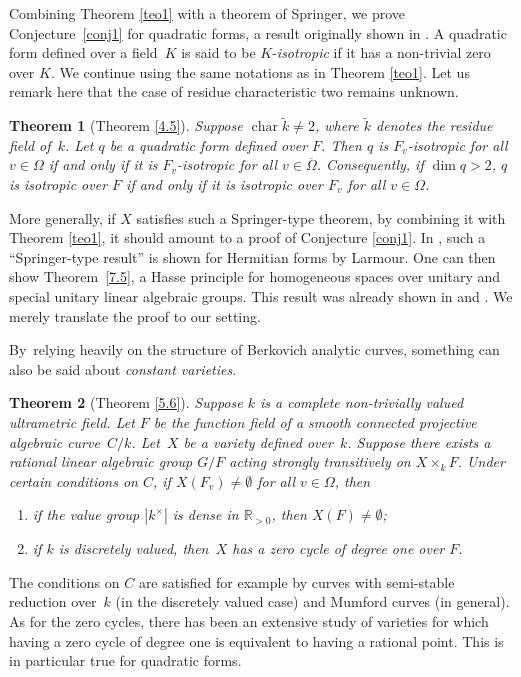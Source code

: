 \documentclass[JEP,XML,SOM,Unicode,NoFloatCountersInSection,published]{cedram}
\DeclareMathOperator{\Char}{char}
\newtheorem{thm}{Theorem}[section]
\theoremstyle{definition}
\begin{document}
Combining Theorem \ref{teo1} with a theorem of Springer, we prove Conjecture~\ref{conj1} for quadratic forms, a result originally shown in \cite{ctps}. A quadratic form defined over a field~$K$ is said to be $K$-\emph{isotropic} if it has a non-trivial zero over $K$. We continue using the same notations as in Theorem \ref{teo1}. Let us remark here that the case of residue characteristic two remains unknown.
\begin{thm}[Theorem \ref{4.5}]
Suppose $\Char \widetilde{k} \neq 2$, where $\widetilde{k}$ denotes the residue field of~$k$. Let $q$ be a quadratic form defined over $F$. Then $q$ is $F_v$-isotropic for all $v \in \Omega$ if and only if it is $F_v$-isotropic for all $v \in \overline{\Omega}$. Consequently, if $\dim{q}>2$, $q$ is isotropic over $F$ if and only if it is isotropic over $F_v$ for all $v \in \Omega$.
\end{thm}

More generally, if $X$ satisfies such a Springer-type theorem, by combining it with Theorem \ref{teo1}, it should amount to a proof of Conjecture \ref{conj1}. In \cite{larmour}, such a ``Springer-type result'' is shown for Hermitian forms by Larmour. One can then show Theorem~\ref{7.5}, a Hasse principle for homogeneous spaces over unitary and special unitary linear algebraic groups. This result was already shown in \cite{wu} and \cite{parsur}. We merely translate the proof to our setting.

By~relying heavily on the structure of Berkovich analytic curves, something can also be said about \emph{constant varieties}.

\begin{thm}[Theorem \ref{5.6}] Suppose $k$ is a complete non-trivially valued ultrametric field.
Let $F$ be the function field of a smooth connected projective algebraic curve~$C/k$. Let~$X$ be a variety \emph{defined over~$k$}. Suppose there exists a rational linear algebraic group ${G/F}$ acting strongly transitively on ${X \times_k F}$. Under certain conditions on $C$, if ${X(F_v) \neq \emptyset}$ for all $v \in \Omega$, then
\begin{enumerate}
\item if the value group $|k^{\times}|$ is dense in $\mathbb{R}_{>0}$, then $X(F) \neq \emptyset$;
\item if $k$ is discretely valued, then~$X$ has a zero cycle of degree one over $F$.
\end{enumerate}
\end{thm}
The conditions on $C$ are satisfied for example by curves with semi-stable reduction over~$k$ (in the discretely valued case) and Mumford curves (in general).
As for the zero cycles, there has been an extensive study of varieties for which having a zero cycle of degree one is equivalent to having a rational point. This is in particular true for quadratic forms.
\end{document}
